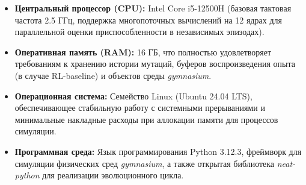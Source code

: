 \begin{itemize}

  \item \textbf{Центральный процессор (CPU):} Intel Core i5-12500H (базовая тактовая частота 2.5 ГГц, поддержка многопоточных вычислений на 12 ядрах для параллельной оценки приспособленности в независимых эпизодах).

  \item \textbf{Оперативная память (RAM):} 16 ГБ, что полностью удовлетворяет требованиям к хранению истории мутаций, буферов воспроизведения опыта (в случае RL-baseline) и объектов среды \textit{gymnasium}.

  \item \textbf{Операционная система:} Семейство Linux (Ubuntu 24.04 LTS), обеспечивающее стабильную работу с системными прерываниями и минимальные накладные расходы при аллокации памяти для процессов симуляции.

  \item \textbf{Программная среда:} Язык программирования Python 3.12.3, фреймворк для симуляции физических сред \textit{gymnasium}, а также открытая библиотека \textit{neat-python} для реализации эволюционного цикла.

\end{itemize}





